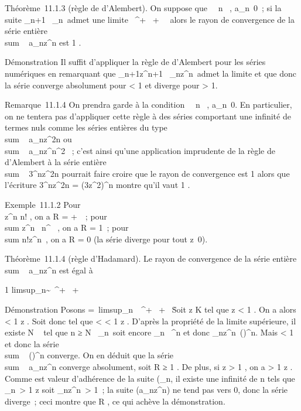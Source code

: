 \documentclass[]{article}
\begin{document}
Théorème~11.1.3 (règle de d'Alembert). On suppose que
\forall~~n \in {}~,
a_n\neq~0~; si la suite 
\a_n+1\
\over
\a_n\ admet
une limite \ell \in {}~^+ \cup\ + \infty~\,
alors le rayon de convergence de la série entière
\\sum ~
a_nz^n est  1 \over \ell .

Démonstration Il suffit d'appliquer la règle de d'Alembert pour les
séries numériques en remarquant que 
\a_n+1z^n+1\
\over
\a_nz^n\
admet la limite \ellz et que donc la série converge
absolument pour \ellz < 1 et diverge pour
\ellz > 1.

Remarque~11.1.4 On prendra garde à la condition
\forall~~n \in {}~,
a_n\neq~0. En particulier, on ne tentera
pas d'appliquer cette règle à des séries comportant une infinité de
termes nuls comme les séries entières du type
\\sum ~
a_nz^2n ou
\\sum ~
a_nz^n^2 ~; c'est ainsi qu'une
application imprudente de la règle de d'Alembert à la série entière
\\sum ~
3^nz^2n pourrait faire croire que le rayon de
convergence est  1 \over 3 alors que l'écriture
3^nz^2n =
\left
(3z^2\right )^n
montre qu'il vaut  1 \over {}
.

Exemple~11.1.2 Pour \\\sum
  z^n \over n! , on a R = +\infty~~; pour
\\sum   z^n~
\over n^\alpha~ , on a R = 1~; pour
\\sum  n!z^n~,
on a R = 0 (la série diverge pour tout z\neq~0).

Théorème~11.1.4 (règle d'Hadamard). Le rayon de convergence de la série
entière \\sum ~
a_nz^n est égal à

 1 \over
limsup\rootn\of\a_n\~
\in {}~^+ \cup\ + \infty~\

Démonstration Posons \ell =\
limsup\rootn\of\a_n\
\in {}~^+ \cup\ + \infty~\. Soit z \in K
tel que z < 1 \over \ell .
On a alors \ell < 1 \over
z . Soit donc \rho tel que \ell < \rho
< 1 \over z . D'après
la propriété de la limite supérieure, il existe N \in {}~ tel que n ≥ N
\rigtharrow~\rootn\of\a_n\
\leq \rho soit encore
\a_n\ \leq
\rho^n et donc
\a_nz^n\
\leq (\rhoz)^n. Mais \rhoz
< 1 et donc la série
\\sum ~
(\rhoz)^n converge. On en déduit que la
série \\sum ~
a_nz^n converge absolument, soit R ≥ 1
\over \ell . De plus, si z
> 1 \over \ell , on a \ell > 1
\over z . Comme \ell est valeur
d'adhérence de la suite
(\rootn\of\a_n\),
il existe une infinité de n tels que
\rootn\of\a_n\
> 1 \over z soit
\a_nz^n\
> 1~; la suite (a_nz^n) ne tend pas
vers 0, donc la série diverge~; ceci montre que R 
\over \ell , ce qui achève la démonstration.
\end{document}

